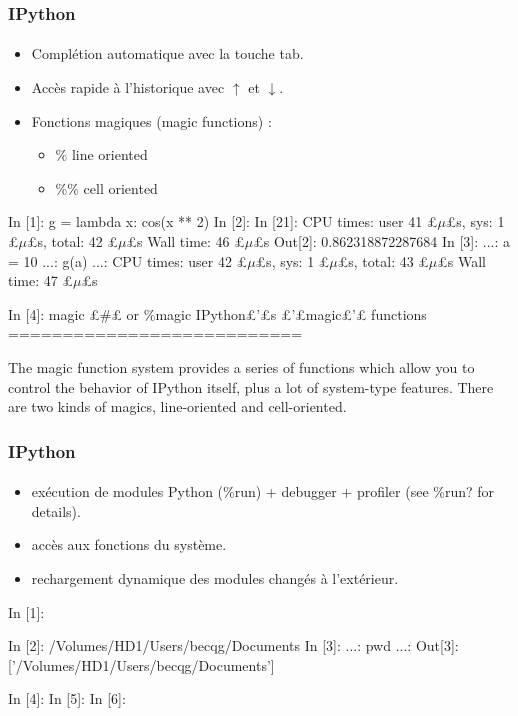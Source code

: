 \begin{frame}[fragile]
\frametitle{IPython}
\framesubtitle{}
\begin{itemize}
 \item Complétion automatique avec la touche tab.
 \item Accès rapide à l'historique avec $\uparrow$ et $\downarrow$.
 \item Fonctions magiques (magic functions) : 
 \begin{itemize}
  \item \% line oriented
  \item \%\% cell oriented
 \end{itemize}
\end{itemize}

\begin{pythonConsole}
In [1]: g = lambda x: cos(x ** 2)
In [2]: In [21]: %
CPU times: user 41 £$\mu$£s, sys: 1 £$\mu$£s, total: 42 £$\mu$£s
Wall time: 46 £$\mu$£s
Out[2]: 0.862318872287684
In [3]: %
    ...: a = 10
    ...: g(a)
    ...: 
CPU times: user 42 £$\mu$£s, sys: 1 £$\mu$£s, total: 43 £$\mu$£s
Wall time: 47 £$\mu$£s

In [4]: magic £\#£ or \%magic
IPython£'£s £'£magic£'£ functions
===========================

The magic function system provides a series of functions which allow you to
control the behavior of IPython itself, plus a lot of system-type
features. There are two kinds of magics, line-oriented and cell-oriented.
\end{pythonConsole}
\end{frame}
\begin{frame}[fragile]
\frametitle{IPython}
\framesubtitle{}
\begin{itemize}
 \item exécution de modules Python (\%run) + debugger + profiler (see \%run? for details).  
 \item accès aux fonctions du système. 
 \item rechargement dynamique des modules changés à l'extérieur. 
\end{itemize}

\begin{pythonConsole}
In [1]: %

In [2]: %
/Volumes/HD1/Users/becqg/Documents
In [3]: %
    ...: pwd
    ...: 
Out[3]: ['/Volumes/HD1/Users/becqg/Documents']

In [4]: %
In [5]: %
In [6]: %
\end{pythonConsole}
\end{frame}
